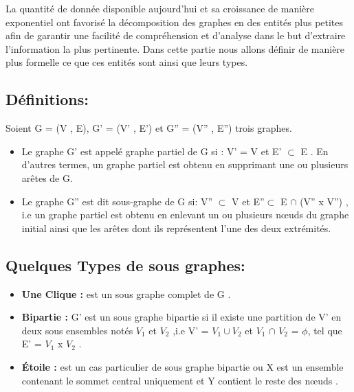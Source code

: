 
	La quantité de donnée disponible aujourd'hui et sa croissance de manière exponentiel ont favorisé la décomposition des graphes en des entités plus petites afin de garantir une facilité de compréhension et d'analyse dans le but d'extraire l'information la plus pertinente. Dans cette partie nous allons définir de manière plus formelle ce que ces entités sont ainsi que leurs types.
	
		
		
		
		\subsection{Définitions:}
		Soient G = (V , E), G' = (V' , E') et G'' = (V'' , E'') trois graphes.
		\begin{itemize}[label=$\circ$]
		
			\item Le graphe G' est appelé graphe partiel de G si : V' = V et E' $\subset$ E \citep{DUT}. En d'autres termes, un graphe partiel est obtenu en supprimant une ou plusieurs arêtes de G.
				

			\item Le graphe G'' est dit sous-graphe de G si: V'' $\subset$ V et 
			 E''$\subset$ E $\cap$ (V'' x V'') \citep{bac}, i.e un graphe partiel est obtenu en enlevant un ou plusieurs nœuds du graphe initial ainsi que les arêtes dont ils représentent l'une des deux extrémités.
			 
		\end{itemize}
		
		\subsection{Quelques Types de sous graphes:}
		
		\begin{itemize} [label = $\bullet$]
		
		
			\item \textbf{Une Clique :} est un sous graphe complet de G \citep{bac}.
			
			\item \textbf{Bipartie :} G' est un sous graphe bipartie si il existe une partition de V' en deux sous ensembles notés $V_{1}$ et $V_{2}$  ,i.e V' = $V_{1} \cup V_{2}$ et $V_{1}$ $\cap$ $V_{2}$ = $\phi$, tel que E' = $V_{1}$ x $V_{2}$ \citep{bac}.
			
		
			
			\item \textbf{Étoile :}
			 est un cas particulier de sous graphe bipartie ou X est un ensemble contenant le sommet central uniquement et Y contient le reste des nœuds \citep{koutra2015summarizing} .
			
			 
		\end{itemize}